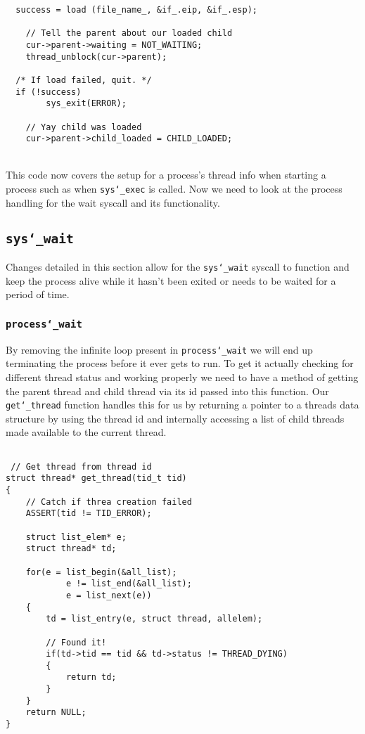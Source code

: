 \documentclass[]{article}
\begin{document}
		\lstset{language=C, tabsize=2}  
		    \begin{lstlisting} 
  success = load (file_name_, &if_.eip, &if_.esp);

	// Tell the parent about our loaded child
	cur->parent->waiting = NOT_WAITING;
	thread_unblock(cur->parent);
  
  /* If load failed, quit. */
  if (!success)
		sys_exit(ERROR);

	// Yay child was loaded
	cur->parent->child_loaded = CHILD_LOADED;
	 \end{lstlisting}
	
\texttt{}\\ This code now covers the setup for a process's thread info when starting a process such as when \texttt{sys\char`_exec} is called. Now we need to look at the process handling for the wait syscall and its functionality.
\newpage
 \subsection{\texttt{sys\char`_wait}}
 Changes detailed in this section allow for the \texttt{sys\char`_wait} syscall to function and keep the process alive while it hasn't been exited or needs to be waited for a period of time.
 
 \subsubsection{\texttt{process\char`_wait}}
 
 By removing the infinite loop present in \texttt{process\char`_wait} we will end up terminating the process before it ever gets to run. To get it actually checking for different thread status and working properly we need to have a method of getting the parent thread and child thread via its id passed into this function. Our \texttt{get\char`_thread} function handles this for us by returning a pointer to a threads data structure by using the thread id and internally accessing a list of child threads made available to the current thread.

 \lstset{language=C, tabsize=2}  
 \begin{lstlisting} 

 // Get thread from thread id
struct thread* get_thread(tid_t tid)
{
	// Catch if threa creation failed
	ASSERT(tid != TID_ERROR);
	
	struct list_elem* e;	
	struct thread* td;
	
	for(e = list_begin(&all_list);
			e != list_end(&all_list);
			e = list_next(e))
	{
		td = list_entry(e, struct thread, allelem);

		// Found it!
		if(td->tid == tid && td->status != THREAD_DYING)
		{
			return td;
		}
	}
	return NULL;
}

 
 \end{lstlisting} 
 
\end{document}

